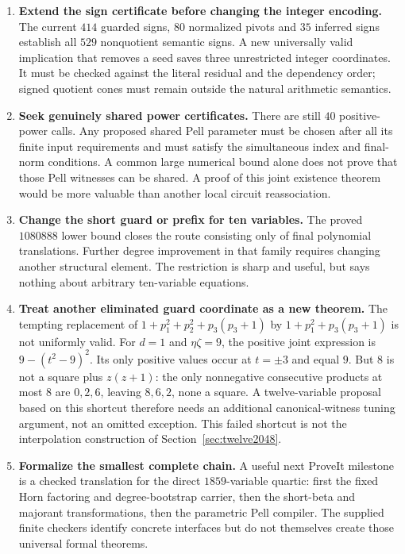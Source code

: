 \documentclass[11pt]{article}
\begin{document}
\begin{enumerate}
\item \textbf{Extend the sign certificate before changing the integer
encoding.} The current $414$ guarded signs, $80$ normalized pivots and $35$
inferred signs establish all $529$ nonquotient semantic signs. A new universally valid implication that removes a seed
saves three unrestricted integer coordinates. It must be checked against
the literal residual and the dependency order; signed quotient cones
must remain outside the natural arithmetic semantics.
\item \textbf{Seek genuinely shared power certificates.} There are still
$40$ positive-power calls. Any proposed shared Pell parameter must be
chosen after all its finite input requirements and must satisfy the
simultaneous index and final-norm conditions. A common large numerical
bound alone does not prove that those Pell witnesses can be shared.
A proof of this joint existence theorem would be more valuable than
another local circuit reassociation.
\item \textbf{Change the short guard or prefix for ten variables.} The
proved $1080888$ lower bound closes the route consisting only of final
polynomial translations. Further degree improvement in that family
requires changing another structural element. The restriction is sharp
and useful, but says nothing about arbitrary ten-variable equations.
\item \textbf{Treat another eliminated guard coordinate as a new theorem.}
The tempting replacement of
$1+p_1^2+p_2^2+p_3(p_3+1)$ by
$1+p_1^2+p_3(p_3+1)$ is not uniformly valid. For $d=1$ and
$\eta\zeta=9$, the positive joint expression is
$9-(t^2-9)^2$. Its only positive values occur at $t=\pm3$ and equal $9$.
But $8$ is not a square plus $z(z+1)$: the only nonnegative consecutive
products at most $8$ are $0,2,6$, leaving $8,6,2$, none a square.
A twelve-variable proposal based on this shortcut therefore needs an
additional canonical-witness tuning argument, not an omitted exception.
This failed shortcut is not the interpolation construction of
Section~\ref{sec:twelve2048}.
\item \textbf{Formalize the smallest complete chain.} A useful next
ProveIt milestone is a checked translation for the direct $1859$-variable
quartic: first the fixed Horn factoring and degree-bootstrap carrier,
then the short-beta and majorant transformations, then the parametric
Pell compiler. The supplied finite checkers identify concrete interfaces
but do not themselves create those universal formal theorems.
\end{enumerate}
\end{document}
